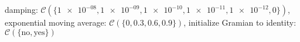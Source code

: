 damping: $\mathcal{C}(\{\num[scientific-notation=true]{1e-08},\num[scientific-notation=true]{1e-09},\num[scientific-notation=true]{1e-10},\num[scientific-notation=true]{1e-11},\num[scientific-notation=true]{1e-12},0\})$, exponential moving average: $\mathcal{C}(\{0,\num[scientific-notation=true]{0.3},\num[scientific-notation=true]{0.6},\num[scientific-notation=true]{0.9}\})$, initialize Gramian to identity: $\mathcal{C}(\{\text{no},\text{yes}\})$